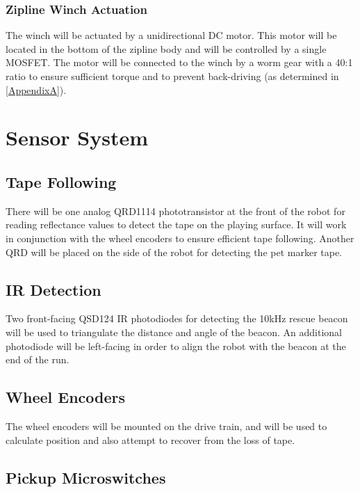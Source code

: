 \documentclass[11pt, oneside]{article} %
\begin{document}
		\subsubsection{Zipline Winch Actuation}
		The winch will be actuated by a unidirectional DC motor. This motor will be located in the bottom of the zipline body and will be controlled by a single MOSFET. The motor will be connected to the winch by a worm gear with a 40:1 ratio to ensure sufficient torque and to prevent back-driving (as determined in \autoref{AppendixA}).


\section{Sensor System}
	
	\subsection{Tape Following}
	
	There will be one analog QRD1114 phototransistor at the front of the robot for reading reflectance values to detect the tape on the playing surface. It will work in conjunction with the wheel encoders to ensure efficient tape following. Another QRD will be placed on the side of the robot for detecting the pet marker tape.
	
	\subsection{IR Detection}
	Two front-facing QSD124 IR photodiodes for detecting the 10kHz rescue beacon will be used to triangulate the distance and angle of the beacon. An additional photodiode will be left-facing in order to align the robot with the beacon at the end of the run.
	
	\subsection{Wheel Encoders}
	
	The wheel encoders will be mounted on the drive train, and will be used to calculate position and also attempt to recover from the loss of tape.
	
	\subsection{Pickup Microswitches}
	
\end{document}
